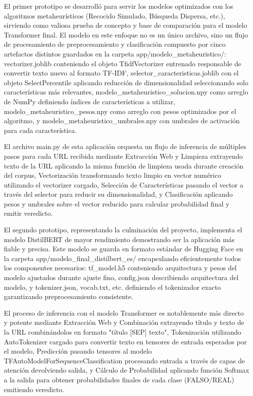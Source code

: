 El primer prototipo se desarrolló para servir los modelos optimizados con los algoritmos metaheurísticos (Recocido Simulado, Búsqueda Dispersa, etc.), sirviendo como valiosa prueba de concepto y base de comparación para el modelo Transformer final. El modelo en este enfoque no es un único archivo, sino un flujo de procesamiento de preprocesamiento y clasificación compuesto por cinco artefactos distintos guardados en la carpeta app/modelo\_metaheuristico/: vectorizer.joblib conteniendo el objeto TfidfVectorizer entrenado responsable de convertir texto nuevo al formato TF-IDF, selector\_caracteristicas.joblib con el objeto SelectPercentile aplicando reducción de dimensionalidad seleccionando solo características más relevantes, modelo\_metaheuristico\_solucion.npy como arreglo de NumPy definiendo índices de características a utilizar, modelo\_metaheuristico\_pesos.npy como arreglo con pesos optimizados por el algoritmo, y modelo\_metaheuristico\_umbrales.npy con umbrales de activación para cada característica.

El archivo main.py de esta aplicación orquesta un flujo de inferencia de múltiples pasos para cada URL recibida mediante Extracción Web y Limpieza extrayendo texto de la URL aplicando la misma función de limpieza usada durante creación del corpus, Vectorización transformando texto limpio en vector numérico utilizando el vectorizer cargado, Selección de Características pasando el vector a través del selector para reducir su dimensionalidad, y Clasificación aplicando pesos y umbrales sobre el vector reducido para calcular probabilidad final y emitir veredicto.

El segundo prototipo, representando la culminación del proyecto, implementa el modelo DistilBERT de mayor rendimiento demostrando ser la aplicación más fiable y precisa. Este modelo se guarda en formato estándar de Hugging Face en la carpeta app/modelo\_final\_distilbert\_es/ encapsulando eficientemente todos los componentes necesarios: tf\_model.h5 conteniendo arquitectura y pesos del modelo ajustados durante ajuste fino, config.json describiendo arquitectura del modelo, y tokenizer.json, vocab.txt, etc. definiendo el tokenizador exacto garantizando preprocesamiento consistente.

El proceso de inferencia con el modelo Transformer es notablemente más directo y potente mediante Extracción Web y Combinación extrayendo título y texto de la URL combinándolos en formato "título [SEP] texto", Tokenización utilizando AutoTokenizer cargado para convertir texto en tensores de entrada esperados por el modelo, Predicción pasando tensores al modelo TFAutoModelForSequenceClassification procesando entrada a través de capas de atención devolviendo salida, y Cálculo de Probabilidad aplicando función Softmax a la salida para obtener probabilidades finales de cada clase (FALSO/REAL) emitiendo veredicto.

